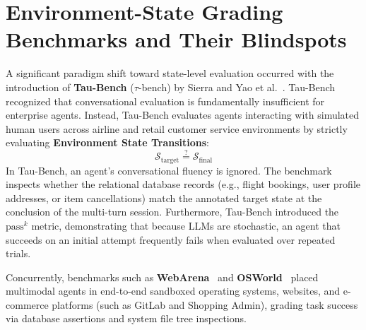 \section{Environment-State Grading Benchmarks and Their Blindspots}
\label{sec:lit_state_benchmarks}
A significant paradigm shift toward state-level evaluation occurred with the introduction of \textbf{Tau-Bench} ($\tau$-bench) by Sierra and Yao et al.~\cite{yao2024taubench}. Tau-Bench recognized that conversational evaluation is fundamentally insufficient for enterprise agents. Instead, Tau-Bench evaluates agents interacting with simulated human users across airline and retail customer service environments by strictly evaluating \textbf{Environment State Transitions}:
\begin{equation}
    \mathcal{S}_{\text{target}} \stackrel{?}{=} \mathcal{S}_{\text{final}}
\end{equation}
In Tau-Bench, an agent's conversational fluency is ignored. The benchmark inspects whether the relational database records (e.g., flight bookings, user profile addresses, or item cancellations) match the annotated target state at the conclusion of the multi-turn session. Furthermore, Tau-Bench introduced the $\text{pass}^k$ metric, demonstrating that because LLMs are stochastic, an agent that succeeds on an initial attempt frequently fails when evaluated over repeated trials.

Concurrently, benchmarks such as \textbf{WebArena}~\cite{zhou2023webarena} and \textbf{OSWorld}~\cite{xie2024osworld} placed multimodal agents in end-to-end sandboxed operating systems, websites, and e-commerce platforms (such as GitLab and Shopping Admin), grading task success via database assertions and system file tree inspections.

